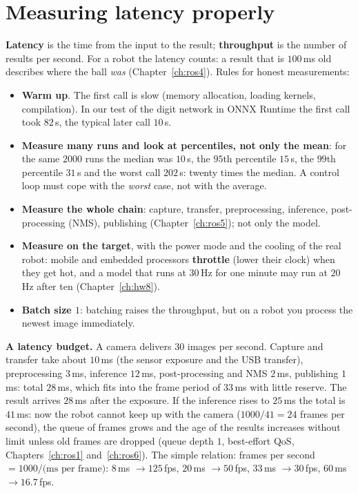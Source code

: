 \section*{Measuring latency properly}
\textbf{Latency} is the time from the input to the result; \textbf{throughput} is the number of results per second. For a robot the latency counts: a result that is $100$\,ms old describes where the ball \emph{was} (Chapter~\ref{ch:ros4}). Rules for honest measurements:
\begin{itemize}[nosep]
\item \textbf{Warm up}. The first call is slow (memory allocation, loading kernels, compilation). In our test of the digit network in ONNX Runtime the first call took $82$\,\textmu s, the typical later call $10$\,\textmu s.
\item \textbf{Measure many runs and look at percentiles, not only the mean}: for the same $2000$ runs the median was $10$\,\textmu s, the $95$th percentile $15$\,\textmu s, the $99$th percentile $31$\,\textmu s and the worst call $202$\,\textmu s: twenty times the median. A control loop must cope with the \emph{worst} case, not with the average.
\item \textbf{Measure the whole chain}: capture, transfer, preprocessing, inference, post-processing (NMS), publishing (Chapter~\ref{ch:ros5}); not only the model.
\item \textbf{Measure on the target}, with the power mode and the cooling of the real robot: mobile and embedded processors \textbf{throttle} (lower their clock) when they get hot, and a model that runs at $30$\,Hz for one minute may run at $20$\,Hz after ten (Chapter~\ref{ch:hw8}).
\item \textbf{Batch size $1$}: batching raises the throughput, but on a robot you process the newest image immediately.
\end{itemize}
\begin{example}
\textbf{A latency budget.} A camera delivers $30$ images per second. Capture and transfer take about $10$\,ms (the sensor exposure and the USB transfer), preprocessing $3$\,ms, inference $12$\,ms, post-processing and NMS $2$\,ms, publishing $1$\,ms: total $28$\,ms, which fits into the frame period of $33$\,ms with little reserve. The result arrives $28$\,ms after the exposure. If the inference rises to $25$\,ms the total is $41$\,ms: now the robot cannot keep up with the camera ($1000/41=24$ frames per second), the queue of frames grows and the age of the results increases without limit unless old frames are dropped (queue depth $1$, best-effort QoS, Chapters~\ref{ch:ros1} and~\ref{ch:ros6}). The simple relation: frames per second $=1000/\text{(ms per frame)}$: $8$\,ms $\to125$\,fps, $20$\,ms $\to50$\,fps, $33$\,ms $\to30$\,fps, $60$\,ms $\to16.7$\,fps.
\end{example}

